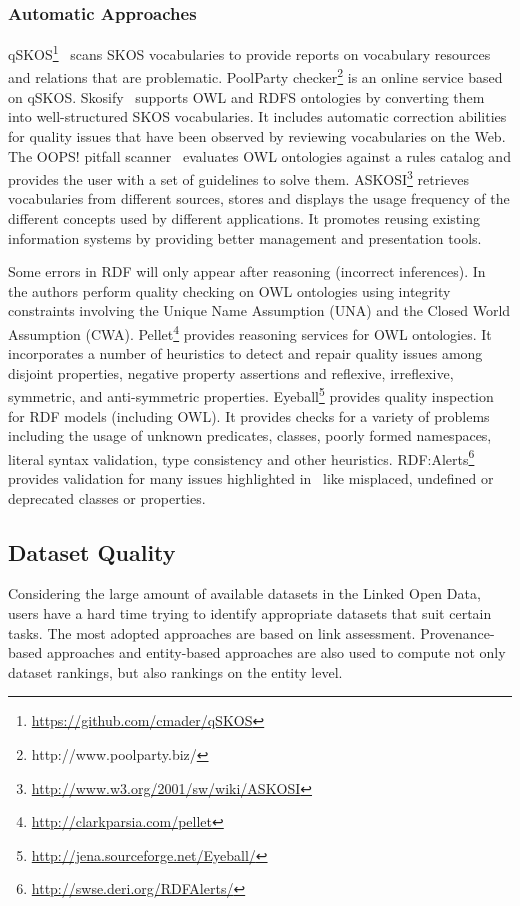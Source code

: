 \subsubsection{Automatic Approaches}
qSKOS\footnote{\url{https://github.com/cmader/qSKOS}}~\cite{Mader:TBDL:12} scans SKOS vocabularies to provide reports on vocabulary resources and relations that are problematic. PoolParty checker\footnote{http://www.poolparty.biz/} is an online service based on qSKOS. Skosify~\cite{Suominen:IKEM:12} supports OWL and RDFS ontologies by converting them into well-structured SKOS vocabularies. It includes automatic correction abilities for quality issues that have been observed by reviewing vocabularies on the Web. The OOPS! pitfall scanner~\cite{PovedaVillalon:EKAW:12} evaluates OWL ontologies against a rules catalog and provides the user with a set of guidelines to solve them. ASKOSI\footnote{\url{http://www.w3.org/2001/sw/wiki/ASKOSI}} retrieves vocabularies from different sources, stores and displays the usage frequency of the different concepts used by different applications. It promotes reusing existing information systems by providing better management and presentation tools.

Some errors in RDF will only appear after reasoning (incorrect inferences). In~\cite{Sirin:OWLED:08,Tao:HICSS:09} the authors perform quality checking on OWL ontologies using integrity constraints involving the Unique Name Assumption (UNA) and the Closed World Assumption (CWA). Pellet\footnote{\url{http://clarkparsia.com/pellet}} provides reasoning services for OWL ontologies. It incorporates a number of heuristics to detect and repair quality issues among disjoint properties, negative property assertions and reflexive, irreflexive, symmetric, and anti-symmetric properties. Eyeball\footnote{\url{http://jena.sourceforge.net/Eyeball/}} provides quality inspection for RDF models (including OWL). It provides checks for a variety of problems including the usage of unknown predicates, classes, poorly formed namespaces, literal syntax validation, type consistency and other heuristics. RDF:Alerts\footnote{\url{http://swse.deri.org/RDFAlerts/}} provides validation for many issues highlighted in~\cite{Hogan:LDOW:10} like misplaced, undefined or deprecated classes or properties.

\subsection{Dataset Quality}
Considering the large amount of available datasets in the Linked Open Data, users have a hard time trying to identify appropriate datasets that suit certain tasks. The most adopted approaches are based on link assessment. Provenance-based approaches and entity-based approaches are also used to compute not only dataset rankings, but also rankings on the entity level.

